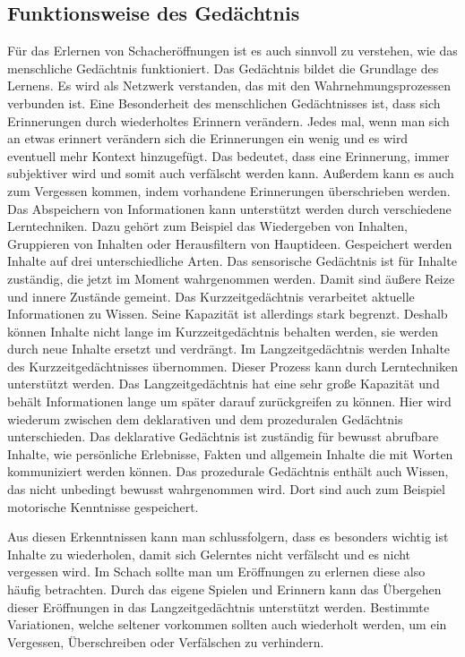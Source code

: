 \subsection{Funktionsweise des Gedächtnis}\label{gedächtnis}
Für das Erlernen von Schacheröffnungen ist es auch sinnvoll zu verstehen, wie das menschliche Gedächtnis funktioniert. Das Gedächtnis bildet die Grundlage des Lernens. Es wird als Netzwerk verstanden, das mit den Wahrnehmungsprozessen verbunden ist. Eine Besonderheit des menschlichen Gedächtnisses ist, dass sich Erinnerungen durch wiederholtes Erinnern verändern. Jedes mal, wenn man sich an etwas erinnert verändern sich die Erinnerungen ein wenig und es wird eventuell mehr Kontext hinzugefügt. Das bedeutet, dass eine Erinnerung, immer subjektiver wird und somit auch verfälscht werden kann. Außerdem kann es auch zum Vergessen kommen, indem vorhandene Erinnerungen überschrieben werden. Das Abspeichern von Informationen kann unterstützt werden durch verschiedene Lerntechniken. Dazu gehört zum Beispiel das Wiedergeben von Inhalten, Gruppieren von Inhalten oder Herausfiltern von Hauptideen. Gespeichert werden Inhalte auf drei unterschiedliche Arten. Das sensorische Gedächtnis ist für Inhalte zuständig, die jetzt im Moment wahrgenommen werden. Damit sind äußere Reize und innere Zustände gemeint. Das Kurzzeitgedächtnis verarbeitet aktuelle Informationen zu Wissen. Seine Kapazität ist allerdings stark begrenzt. Deshalb können Inhalte nicht lange im Kurzzeitgedächtnis behalten werden, sie werden durch neue Inhalte ersetzt und verdrängt. Im Langzeitgedächtnis werden Inhalte des Kurzzeitgedächtnisses übernommen. Dieser Prozess kann durch Lerntechniken unterstützt werden. Das Langzeitgedächtnis hat eine sehr große Kapazität und behält Informationen lange um später darauf zurückgreifen zu können. Hier wird wiederum zwischen dem deklarativen und dem prozeduralen Gedächtnis unterschieden. Das deklarative Gedächtnis ist zuständig für bewusst abrufbare Inhalte, wie persönliche Erlebnisse, Fakten und allgemein Inhalte die mit Worten kommuniziert werden können. Das prozedurale Gedächtnis enthält auch Wissen, das nicht unbedingt bewusst wahrgenommen wird. Dort sind auch zum Beispiel motorische Kenntnisse gespeichert.
\cite{kron_grundwissen_2024}

Aus diesen Erkenntnissen kann man schlussfolgern, dass es besonders wichtig ist Inhalte zu wiederholen, damit sich Gelerntes nicht verfälscht und es nicht vergessen wird. Im Schach sollte man um Eröffnungen zu erlernen diese also häufig betrachten. Durch das eigene Spielen und Erinnern kann das Übergehen dieser Eröffnungen in das Langzeitgedächtnis unterstützt werden. Bestimmte Variationen, welche seltener vorkommen sollten auch wiederholt werden, um ein Vergessen, Überschreiben oder Verfälschen zu verhindern.


